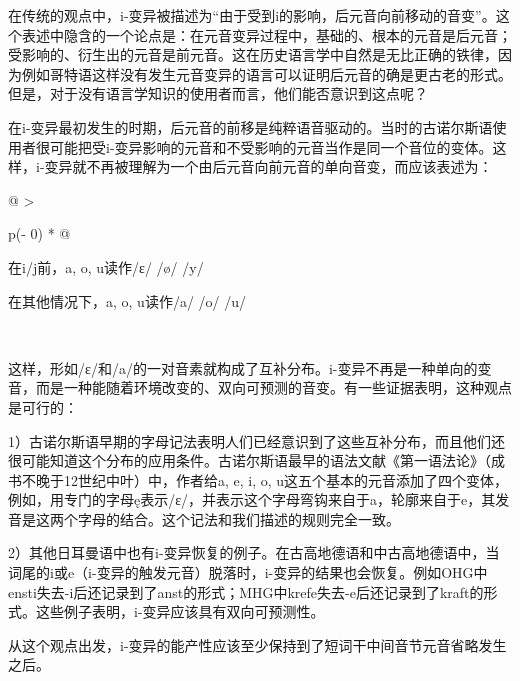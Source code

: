 {{在传统的观点中，i-变异被描述为``由于受到i的影响，后元音向前移动的音变''。这个表述中隐含的一个论点是：在元音变异过程中，基础的、根本的元音是后元音；受影响的、衍生出的元音是前元音。这在历史语言学中自然是无比正确的铁律，因为例如哥特语这样没有发生元音变异的语言可以证明后元音的确是更古老的形式。但是，对于没有语言学知识的使用者而言，他们能否意识到这点呢？

在i-变异最初发生的时期，后元音的前移是纯粹语音驱动的。当时的古诺尔斯语使用者很可能把受i-变异影响的元音和不受影响的元音当作是同一个音位的变体。这样，i-变异就不再被理解为一个由后元音向前元音的单向音变，而应该表述为：

\begin{longtable}[]{@{}
  >{\raggedright\arraybackslash}p{(\columnwidth - 0\tabcolsep) * }@{}}
\toprule\noalign{}
\begin{minipage}[b]{\linewidth}\raggedright
在i/j前，a, o, u读作/ɛ/ /ø/ /y/

在其他情况下，a, o, u读作/a/ /o/ /u/
\end{minipage} \\
\midrule\noalign{}
\endhead
\bottomrule\noalign{}
\endlastfoot
\end{longtable}

这样，形如/ɛ/和/a/的一对音素就构成了互补分布。i-变异不再是一种单向的变音，而是一种能随着环境改变的、双向可预测的音变。有一些证据表明，这种观点是可行的：

1）古诺尔斯语早期的字母记法表明人们已经意识到了这些互补分布，而且他们还很可能知道这个分布的应用条件。古诺尔斯语最早的语法文献《第一语法论》（成书不晚于12世纪中叶）中，作者给a,
e, i, o,
u这五个基本的元音添加了四个变体，例如，用专门的字母ę表示/ɛ/，并表示这个字母弯钩来自于a，轮廓来自于e，其发音是这两个字母的结合。这个记法和我们描述的规则完全一致。

2）其他日耳曼语中也有i-变异恢复的例子。在古高地德语和中古高地德语中，当词尾的i或e（i-变异的触发元音）脱落时，i-变异的结果也会恢复。例如OHG中ensti失去-i后还记录到了anst的形式；MHG中krefe失去-e后还记录到了kraft的形式。这些例子表明，i-变异应该具有双向可预测性。

从这个观点出发，i-变异的能产性应该至少保持到了短词干中间音节元音省略发生之后。

}}
